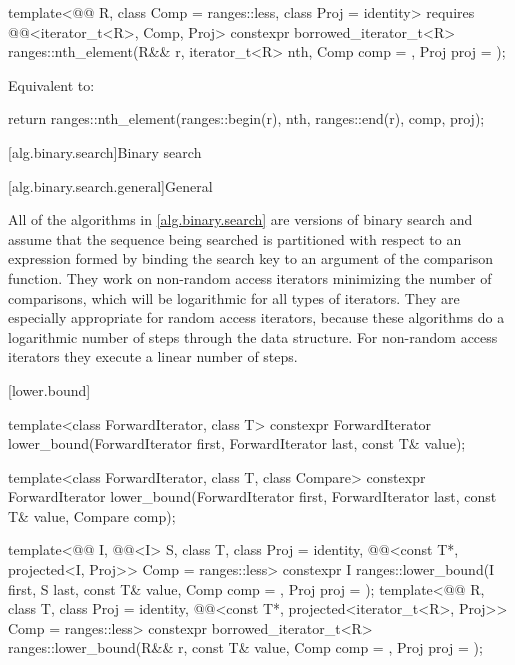 \begin{itemdecl}
template<@@ R, class Comp = ranges::less, class Proj = identity>
  requires @@<iterator_t<R>, Comp, Proj>
  constexpr borrowed_iterator_t<R>
    ranges::nth_element(R&& r, iterator_t<R> nth, Comp comp = {}, Proj proj = {});
\end{itemdecl}

\begin{itemdescr}
\pnum
\effects
Equivalent to:
\begin{codeblock}
return ranges::nth_element(ranges::begin(r), nth, ranges::end(r), comp, proj);
\end{codeblock}
\end{itemdescr}

[alg.binary.search]{Binary search}

[alg.binary.search.general]{General}

\pnum
All of the algorithms in \ref{alg.binary.search} are versions of binary search and
assume that the sequence being searched
is partitioned with respect to an expression
formed by binding the search key to an argument of the comparison function.
They work on non-random access iterators minimizing the number of comparisons,
which will be logarithmic for all types of iterators.
They are especially appropriate for random access iterators,
because these algorithms do a logarithmic number of steps
through the data structure.
For non-random access iterators they execute a linear number of steps.

[lower.bound]{}

%
\begin{itemdecl}
template<class ForwardIterator, class T>
  constexpr ForwardIterator
    lower_bound(ForwardIterator first, ForwardIterator last,
                const T& value);

template<class ForwardIterator, class T, class Compare>
  constexpr ForwardIterator
    lower_bound(ForwardIterator first, ForwardIterator last,
                const T& value, Compare comp);

template<@@ I, @@<I> S, class T, class Proj = identity,
         @@<const T*, projected<I, Proj>> Comp = ranges::less>
  constexpr I ranges::lower_bound(I first, S last, const T& value, Comp comp = {},
                                  Proj proj = {});
template<@@ R, class T, class Proj = identity,
         @@<const T*, projected<iterator_t<R>, Proj>> Comp =
           ranges::less>
  constexpr borrowed_iterator_t<R>
    ranges::lower_bound(R&& r, const T& value, Comp comp = {}, Proj proj = {});
\end{itemdecl}


